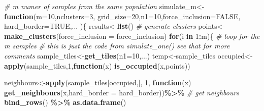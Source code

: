 \documentclass[
]{article}
\newenvironment{Shaded}{\begin{snugshade}}{\end{snugshade}}
\newcommand{\AttributeTok}[1]{\textcolor[rgb]{0.13,0.29,0.53}{#1}}
\newcommand{\CommentTok}[1]{\textcolor[rgb]{0.56,0.35,0.01}{\textit{#1}}}
\newcommand{\ConstantTok}[1]{\textcolor[rgb]{0.56,0.35,0.01}{#1}}
\newcommand{\ControlFlowTok}[1]{\textcolor[rgb]{0.13,0.29,0.53}{\textbf{#1}}}
\newcommand{\DecValTok}[1]{\textcolor[rgb]{0.00,0.00,0.81}{#1}}
\newcommand{\FunctionTok}[1]{\textcolor[rgb]{0.13,0.29,0.53}{\textbf{#1}}}
\newcommand{\NormalTok}[1]{#1}
\newcommand{\OtherTok}[1]{\textcolor[rgb]{0.56,0.35,0.01}{#1}}
\newcommand{\SpecialCharTok}[1]{\textcolor[rgb]{0.81,0.36,0.00}{\textbf{#1}}}
\begin{document}
\begin{Shaded}
\begin{Highlighting}[]
\CommentTok{\# m numer of samples from the same population}
\NormalTok{simulate\_m}\OtherTok{\textless{}{-}}\ControlFlowTok{function}\NormalTok{(}\AttributeTok{m=}\DecValTok{10}\NormalTok{,}\AttributeTok{nclusters=}\DecValTok{3}\NormalTok{, }\AttributeTok{grid\_size=}\DecValTok{20}\NormalTok{,}\AttributeTok{n1=}\DecValTok{10}\NormalTok{,}\AttributeTok{force\_inclusion=}\ConstantTok{FALSE}\NormalTok{, }\AttributeTok{hard\_border=}\ConstantTok{TRUE}\NormalTok{,...  )\{}
\NormalTok{  results}\OtherTok{\textless{}{-}}\FunctionTok{list}\NormalTok{()}
  \CommentTok{\# generate clusters}
\NormalTok{  points}\OtherTok{\textless{}{-}}\FunctionTok{make\_clusters}\NormalTok{(}\AttributeTok{force\_inclusion =}\NormalTok{ force\_inclusion)}
  \ControlFlowTok{for}\NormalTok{(i }\ControlFlowTok{in} \DecValTok{1}\SpecialCharTok{:}\NormalTok{m)\{ }\CommentTok{\# loop for the m samples}
    \CommentTok{\# this is just the code from simulate\_one() see that for more comments}
\NormalTok{    sample\_tiles}\OtherTok{\textless{}{-}}\FunctionTok{get\_tiles}\NormalTok{(}\AttributeTok{n1=}\DecValTok{10}\NormalTok{,...)}
\NormalTok{    temp}\OtherTok{\textless{}{-}}\NormalTok{sample\_tiles}
\NormalTok{    occupied}\OtherTok{\textless{}{-}}\FunctionTok{apply}\NormalTok{(sample\_tiles,}\DecValTok{1}\NormalTok{,}\ControlFlowTok{function}\NormalTok{(x) }\FunctionTok{is\_occupied}\NormalTok{(x,points))}
    
\NormalTok{    neighbours}\OtherTok{\textless{}{-}}\FunctionTok{apply}\NormalTok{(sample\_tiles[occupied,], }\DecValTok{1}\NormalTok{, }\ControlFlowTok{function}\NormalTok{(x) }\FunctionTok{get\_neighbours}\NormalTok{(x,}\AttributeTok{hard\_border =}\NormalTok{ hard\_border))}\SpecialCharTok{\%\textgreater{}\%} \CommentTok{\# get neighbours}
      \FunctionTok{bind\_rows}\NormalTok{() }\SpecialCharTok{\%\textgreater{}\%} 
      \FunctionTok{as.data.frame}\NormalTok{() }
    

\end{Highlighting}
\end{Shaded}
\end{document}
